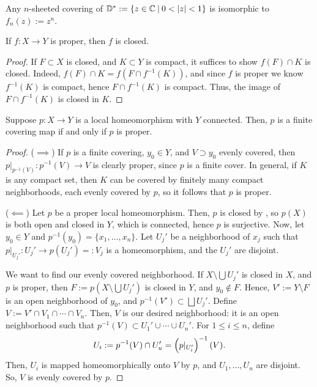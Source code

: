 \documentclass[11pt]{article}
\begin{document}
\begin{ex}
    Any $n$-sheeted covering of $\mathbb D^*:= \left \{ z \in \mathbb{C} \: \middle |\: 0 < \left | z \right | < 1 \right \}$ is isomorphic to $f_n(z):=z^n$.
\end{ex}

\begin{lem}[][label=lem:proper_closed]
    If $f:X \to Y$ is proper, then $f$ is closed.
\end{lem}

\begin{proof}
    If $F \subset X$ is closed, and $K \subset Y$ is compact, it suffices to show $f(F) \cap K$ is closed. Indeed, $f(F) \cap K = f(F \cap f^{-1}(K))$, and since $f$ is proper we know $f^{-1}(K)$ is compact, hence $F \cap f^{-1}(K)$ is compact. Thus, the image of $F \cap f^{-1}(K)$ is closed in $K$.
\end{proof}

\begin{prop}
    Suppose $p:X \to Y$ is a local homeomorphism with $Y$ connected. Then, $p$ is a finite covering map if and only if $p$ is proper.
\end{prop}

\begin{proof}
    \hfill \break
    ($\implies$) If $p$ is a finite covering, $y_0 \in Y$, and $V\supset y_0$ evenly covered, then $p|_{p^{-1}(V)}:p^{-1}(V) \to V$ is clearly proper, since $p$ is a finite cover. In general, if $K$ is any compact set, then $K$ can be covered by finitely many compact neighborhoods, each evenly covered by $p$, so it follows that $p$ is proper.  

    ($\impliedby$) Let $p$ be a proper local homeomorphism. Then, $p$ is closed by , so $p(X)$ is both open and closed in $Y$, which is connected, hence $p$ is surjective. Now, let $y_0 \in Y$ and $p^{-1}(y_0)=\{x_1,\dots,x_n\}$. Let $U_j'$ be a neighborhood of $x_j$ such that $p|_{U_j'}:U_j' \to p(U_j')=:V_j$ is a homeomorphism, and the $U_j'$ are disjoint.

    We want to find our evenly covered neighborhood. If $X \setminus \bigcup U_j'$ is closed in $X$, and $p$ is proper, then $F:=p(X \setminus \bigcup U_j')$ is closed in $Y$, and $y_0 \not \in F$. Hence, $V':=Y\setminus F$ is an open neighborhood of $y_0$, and $p^{-1}(V') \subset \bigsqcup U_j'$. Define $V:= V' \cap V_1 \cap \cdots \cap V_n$. Then, $V$ is our desired neighborhood: it is an open neighborhood such that $p^{-1}(V) \subset U_1' \cup \cdots \cup U_n'$. For $1 \leq i \leq n$, define
    $$U_i:= p^{-1}(V) \cap U_u' = \left ( p|_{U_i'} \right )^{-1}(V).$$
    Then, $U_i$ is mapped homeomorphically onto $V$ by $p$, and $U_1,\dots,U_n$ are disjoint. So, $V$ is evenly covered by $p$.
\end{proof}
\end{document}
